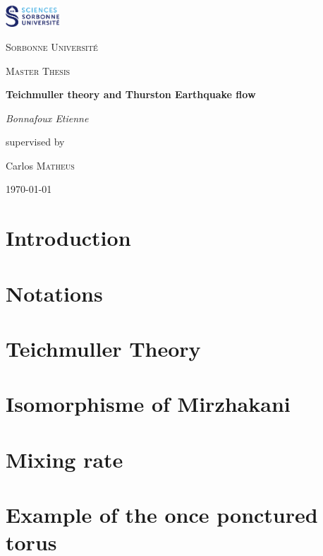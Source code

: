 \documentclass[12pt]{article}
\theoremstyle{plain}%
\theoremstyle{definition}
\theoremstyle{remark}
\begin{document}

\begin{titlepage}
	\centering
	\includegraphics[width=0.15\textwidth]{Image/Sorbonne.png}\par\vspace{1cm}
	{\scshape\LARGE Sorbonne Université \par}
	\vspace{1cm}
	{\scshape\Large Master Thesis\par}
	\vspace{1.5cm}
	{\huge\bfseries Teichmuller theory and Thurston Earthquake flow\par}
	\vspace{2cm}
	{\Large\itshape Bonnafoux Etienne\par}
	\vfill
	supervised by\par
	Carlos \textsc{Matheus}

	\vfill

	{\large \today\par}
\end{titlepage}

\newpage


\newpage

\tableofcontents
\newpage

\section{Introduction}

\newpage

\section{Notations}
\printnomenclature

\newpage

\section{Teichmuller Theory}

\newpage

\section{Isomorphisme of Mirzhakani}

\newpage

\section{Mixing rate}

\newpage

\section{Example of the once ponctured torus}

\newpage



\end{document}
